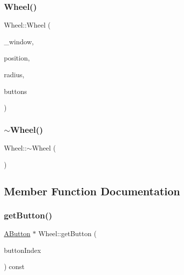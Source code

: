 \mbox{\label{class_wheel_a2dda8257d6aa2bc6c2c657e724db1803}} 
\subsubsection{\texorpdfstring{Wheel()}{Wheel()}\hspace{0.1cm}{\footnotesize\ttfamily [2/2]}}
{\footnotesize\ttfamily Wheel\+::\+Wheel (\begin{DoxyParamCaption}\item[{\mbox{\hyperlink{class_window}{Window}} \&}]{\+\_\+window,  }\item[{const vector3df \&}]{position,  }\item[{const float \&}]{radius,  }\item[{const std\+::vector$<$ \mbox{\hyperlink{struct_wheel_1_1_param_button}{Wheel\+::\+Param\+Button}} $>$ \&}]{buttons }\end{DoxyParamCaption})}

\mbox{\label{class_wheel_a947c31796408a9bb9b6a01629c093806}} 
\subsubsection{\texorpdfstring{$\sim$Wheel()}{~Wheel()}}
{\footnotesize\ttfamily Wheel\+::$\sim$\+Wheel (\begin{DoxyParamCaption}{ }\end{DoxyParamCaption})\hspace{0.3cm}{\ttfamily [override]}}



\subsection{Member Function Documentation}
\mbox{\label{class_wheel_a873fe00de07b96a68156204c06d85310}} 
\subsubsection{\texorpdfstring{getButton()}{getButton()}}
{\footnotesize\ttfamily \mbox{\hyperlink{class_a_button}{A\+Button}} $\ast$ Wheel\+::get\+Button (\begin{DoxyParamCaption}\item[{const uint \&}]{button\+Index }\end{DoxyParamCaption}) const}

